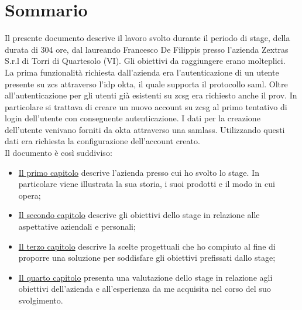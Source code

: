 
\cleardoublepage
{}
{}
\begingroup
\let\clearpage\relax
\let\cleardoublepage\relax
\let\cleardoublepage\relax

\chapter*{Sommario}

Il presente documento descrive il lavoro svolto durante il periodo di stage, della durata di 304 ore, dal laureando Francesco De Filippis presso l'azienda Zextras S.r.l di Torri di Quartesolo (VI).
Gli obiettivi da raggiungere erano molteplici.\\
La prima funzionalità richiesta dall'azienda era l'autenticazione di un utente presente su \gls{zcs} attraverso l'\gls{idp} \gls{okta}, il quale supporta il protocollo \gls{saml}.
Oltre all'autenticazione per gli utenti già esistenti su \gls{zcsg} era richiesto anche il \gls{prov}. In particolare si trattava di creare un nuovo account su \gls{zcsg} al primo tentativo di login dell'utente con conseguente autenticazione. I dati per la creazione dell'utente venivano forniti da \gls{okta} attraverso una \gls{samlass}. Utilizzando questi dati era richiesta la configurazione dell'account creato.\\
Il documento è così suddiviso:
\begin{itemize}
    \item \hyperref[cap:azienda]{Il primo capitolo} descrive l'azienda presso cui ho svolto lo stage. In particolare viene illustrata la sua storia, i suoi prodotti e il modo in cui opera;
    \item \hyperref[cap:obiettivi]{Il secondo capitolo} descrive gli obiettivi dello stage
    in relazione alle aspettative aziendali e personali;
    \item \hyperref[cap:resoconto]{Il terzo capitolo} descrive la scelte progettuali che ho compiuto al fine di proporre una soluzione per soddisfare gli obiettivi prefissati dallo stage;
    \item \hyperref[cap:retrospettiva]{Il quarto capitolo} presenta una valutazione dello stage in relazione agli obiettivi dell'azienda e all'esperienza da me acquisita nel corso del suo svolgimento.
\end{itemize}

%
%

\endgroup			

\vfill

